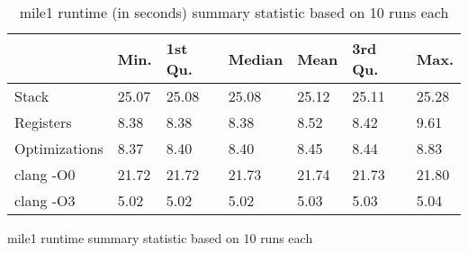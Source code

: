\begin{table}[h!]
\centering
\begin{tabular}{p{}p{}p{}p{}p{}p{}p{}}
  \hline
 & Min. & 1st Qu. & Median & Mean & 3rd Qu. & Max. \\ 
  \hline
Stack & 25.07 & 25.08 & 25.08 & 25.12 & 25.11 & 25.28 \\ 
  Registers & 8.38 & 8.38 & 8.38 & 8.52 & 8.42 & 9.61 \\ 
  Optimizations & 8.37 & 8.40 & 8.40 & 8.45 & 8.44 & 8.83 \\ 
  clang -O0 & 21.72 & 21.72 & 21.73 & 21.74 & 21.73 & 21.80 \\ 
  clang -O3 & 5.02 & 5.02 & 5.02 & 5.03 & 5.03 & 5.04 \\ 
   \hline
\end{tabular}
\caption{mile1 runtime summary statistic based on 10 runs each}
\caption{mile1 runtime (in seconds) summary statistic based on 10 runs each}
\end{table}
